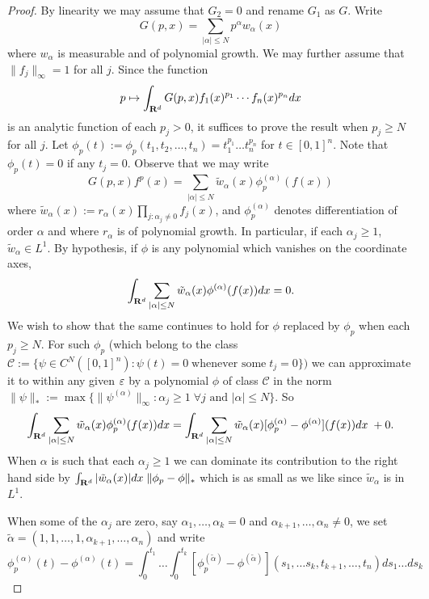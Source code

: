 
\begin{proof}
By linearity we may assume that $G_2=0$ and rename $G_1$ as $G$. Write
$$G(p,x) = \sum_{|\alpha| \leq N} p^{\alpha} w_{\alpha} (x)$$
where $w_{\alpha}$ is measurable and of polynomial growth.
 We may further
assume
that $\|f_j\|_{\infty} = 1$ for all $j$. Since the function
$$p \mapsto \int_{{\bf R}^{d}}G(p,x)f_{1}(x)^{p_{1}}\cdots f_n(x)^{p_n}dx$$
is an analytic function of each $p_j>0$, it suffices to prove the
result when $p_j \geq N$ for all $j$.
Let $\phi_p(t) := \phi_p (t_1, t_2, \dots , t_n) = t_1^{p_1} \dots t_n^{p_n}$
for $t \in [0,1]^n$. Note that $\phi_p (t) = 0$ if any $t_j = 0.$
Observe that we may write
$$G(p,x)f^p(x) = \sum_{|\alpha| \leq N} \tilde{w}_\alpha (x) \phi_p ^{(\alpha)}
(f(x)) $$
where $\tilde{w}_\alpha (x) := r_{\alpha} (x)
\prod_{j: \alpha_j \neq 0} f_j (x)$, and
$\phi_p^{(\alpha)}$ denotes differentiation of order $\alpha$ and where
$r_\alpha$ is of polynomial growth. In particular, if each $\alpha_j \geq 1$,
$\tilde{w}_\alpha \in L^1.$
By hypothesis, if $\phi$ is any polynomial which vanishes on the coordinate
axes,
\begin{equation}\label{last}
\int_{{\bf R}^d} \sum_{|\alpha| \leq N} \tilde{w}_\alpha (x)
\phi^{(\alpha)}(f(x)) dx = 0.
\end{equation}
We wish to show that the same continues to hold for $\phi$ replaced by
$\phi_p$ when each $p_j \geq N$. For such $\phi_p$ (which belong to the class
$ {\mathcal{C}} := \{\psi \in C^{N} ([0,1]^n)  : \psi(t)=0 \;
\mbox{whenever some} \; t_j =0\})$
we can approximate it to within any given $\varepsilon$ by a polynomial $\phi$ of
class $\mathcal{C}$ in the norm $\| \psi \|_{*} :=
\max\{\| \psi^{(\alpha)}\|_{\infty}:\alpha_j \geq 1 \;
\forall j\mbox{ and }|\alpha|\leq N\}$.
So
$$ \int_{{\bf R}^d} \sum_{|\alpha| \leq N} \tilde{w}_\alpha (x)
\phi_p ^{(\alpha)}(f(x)) dx =
\int_{{\bf R}^d} \sum_{|\alpha| \leq N} \tilde{w}_\alpha (x)
[\phi_p ^{(\alpha)} - \phi^{(\alpha)}](f(x)) dx \; +0.$$
When $\alpha$ is such that each $\alpha_j \geq 1$ we can dominate
its contribution to the right hand side by
$\int_{{\bf R}^d} | \tilde{w}_{\alpha} (x)| dx \; \| \phi_p - \phi \|_{*}$
which is as small as we like since $\tilde{w}_{\alpha}$ is in $L^1$.

When some of the $\alpha_j$ are zero, say $\alpha_1, \dots , \alpha_k = 0$ and
$\alpha_{k+1}, \dots ,\alpha_n \neq 0$, we set $\tilde{\alpha} = (1,1, \dots,
1, \alpha_{k+1}, \dots, \alpha_n)$ and write
$$\phi_p ^{(\alpha)}(t) - \phi^{(\alpha)}(t) =
\int_0^{t_1} \dots \int_0^{t_k} [\phi_p ^{(\tilde{\alpha})} -
\phi^{(\tilde{\alpha})}](s_1, \dots s_k , t_{k+1}, \dots , t_n)
ds_1 \dots ds_k $$


\end{proof}
